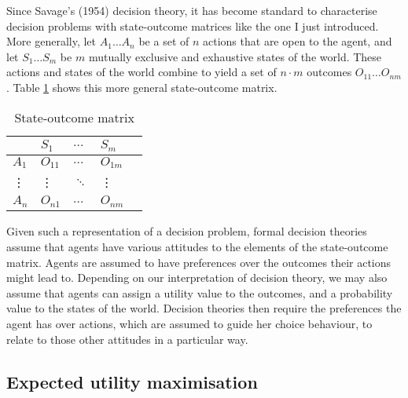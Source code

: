 Since Savage's (1954) decision theory, it has become standard to characterise decision problems with state-outcome matrices like the one I just introduced. More generally, let $A_{1} \ldots A_{n}$ be a set of $n$ actions that are open to the agent, and let $S_{1} \ldots S_{m}$ be $m$ mutually exclusive and exhaustive states of the world. These actions and states of the world combine to yield a set of $n \cdot m$ outcomes $O_{11} \ldots O_{nm}$. Table \ref{t2} shows this more general state-outcome matrix.

\begin{table}[h]
\centering
\begin{tabular}{lllll}
\hline
                             & $S_{1}$  & $\ldots$ & $S_{m}$  &   \\\hline\hline
\multicolumn{1}{l}{$A_{1}$}  &$ O_{11}$ & $\ldots$ & $O_{1m}$ &   \\
\multicolumn{1}{l}{\vdots}   & \vdots   & $\ddots$ & \vdots   &   \\
\multicolumn{1}{l}{$A_{n}$}  & $O_{n1}$ & $\ldots$ & $O_{nm}$ &   \\
\hline
\end{tabular}
\caption{State-outcome matrix}
\label{t2}
\end{table}

Given such a representation of a decision problem, formal decision theories assume that agents have various attitudes to the elements of the state-outcome matrix. Agents are assumed to have preferences over the outcomes their actions might lead to. Depending on our interpretation of decision theory, we may also assume that agents can assign a utility value to the outcomes, and a probability value to the states of the world. Decision theories then require the preferences the agent has over actions, which are assumed to guide her choice behaviour, to relate to those other attitudes in a particular way.

\subsection{Expected utility maximisation}\label{subs12}

